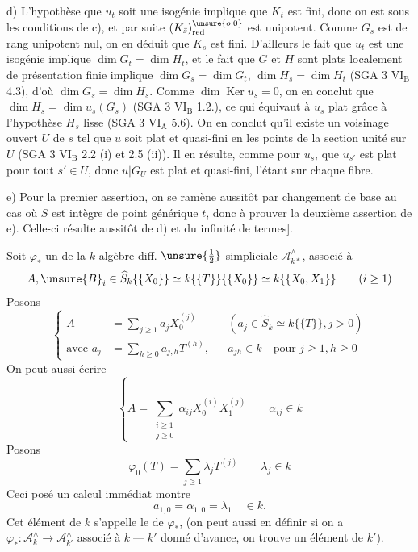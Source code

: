 d) L'hypothèse que $u_t$ soit une isogénie implique que $K_t$ est
fini, donc on est sous les conditions de c), et par suite $(K_{\bar s})^{\unsure{o|0}}_{\mathrm{red}}$ est
unipotent. Comme $G_s$ est de rang unipotent nul, on en déduit que $K_s$
est fini. D'ailleurs le fait que $u_t$ est une isogénie implique
$\dim G_t=\dim H_t$, et le fait que $G$ et $H$ sont plats localement de présentation finie implique $\dim G_s=\dim G_t$, $\dim H_s=\dim H_t$ (SGA 3 $\mathrm{VI_B}$ 4.3),
d'où $\dim G_s=\dim H_s$. Comme $\dim\operatorname{Ker}u_s=0$, on en conclut que
$\dim H_s=\dim u_s(G_s)$ (SGA 3 $\mathrm{VI_B}$ 1.2.), ce qui équivaut à $u_s$ plat
grâce à l'hypothèse $H_s$ lisse (SGA 3 $\mathrm{VI_A}$ 5.6). On en conclut qu'il
existe un voisinage ouvert $U$ de $s$ tel que $u$ soit plat et quasi-fini
en les points de la section unité sur $U$ (SGA 3 $\mathrm{VI_B}$ 2.2 (i) et 2.5 (ii)).
Il en résulte, comme pour $u_s$, que $u_{s'}$ est plat pour tout $s'\in U$, donc
$u|G_U$ est plat et quasi-fini, l'étant sur chaque fibre.

e) Pour la premier assertion, on se ramène aussitôt par
changement de base au cas où $S$ est intègre de point générique $t$, donc
à prouver la deuxième assertion de e). Celle-ci résulte aussitôt de d) et du
infinité de termes].

Soit $\varphi_*$ un \uline{} de la
$k$-algèbre diff. $\unsure{\tfrac12}$-simpliciale $\mathcal A_{k*}^\wedge$, associé à
\[
 A,\unsure{B}_i\in\widehat S_k\{\{X_0\}\}\simeq
 k\{\{T\}\}\{\{X_0\}\}\simeq k\{\{X_0,X_1\}\}
 \qquad(i\geq1)
\]
Posons
\[
 \left\{\begin{aligned}
 A&=\sum_{j\geq1}a_jX_0^{(j)}
 &&(a_j\in\widehat S_k\simeq k\{\{T\}\},j>0)\\
 \text{avec }a_j&=\sum_{h\geq0}a_{j,h}T^{(h)},
 &&a_{jh}\in k\quad\text{pour }j\geq1,h\geq0
 \end{aligned}\right.
\]
On peut aussi écrire
\[
 \left\{A=\sum_{\substack{i\geq1\\j\geq0}}\alpha_{ij}X_0^{(i)}X_1^{(j)}
 \qquad\alpha_{ij}\in k\right.
\]
Posons
\[
 \varphi_0(T)=\sum_{j\geq1}\lambda_jT^{(j)}\qquad\lambda_j\in k
\]
Ceci posé un calcul immédiat montre
\[
 \boxed{a_{1,0}=\alpha_{1,0}=\lambda_1}\quad\in k.
\]
Cet élément de $k$ s'appelle le
de $\varphi_*$, 
(on peut aussi en définir si on a
$\varphi_*:\mathcal A_k^\wedge\longrightarrow \mathcal A_{k'}^\wedge$ associé à
$k\mathbin{\text{---}}k'$ donné d'avance, on trouve un élément de $k'$).

